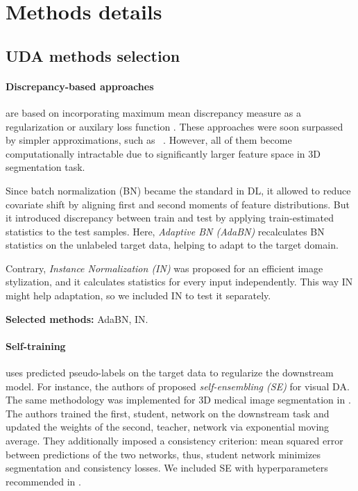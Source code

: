 

\section{Methods details}


\subsection{UDA methods selection}


\paragraph{Discrepancy-based approaches} are based on incorporating maximum mean discrepancy measure as a regularization or auxilary loss function \cite{mmd_ghifary2014domain,mmd_tzeng2014deep,mmd_long2015learning}. These approaches were soon surpassed by simpler approximations, such as ~\cite{deepcoral}. However, all of them become computationally intractable due to significantly larger feature space in 3D segmentation task.%

Since batch normalization (BN) \cite{bn} became the standard in DL, it allowed to reduce covariate shift by aligning first and second moments of feature distributions. But it introduced discrepancy between train and test by applying train-estimated statistics to the test samples. Here, \textit{Adaptive BN (AdaBN)} \cite{adabn} recalculates BN statistics on the unlabeled target data, helping to adapt to the target domain.

Contrary, \textit{Instance Normalization (IN)} \cite{instance_norm} was proposed for an efficient image stylization, and it calculates statistics for every input independently. This way IN might help adaptation, so we included IN to test it separately.


\textbf{Selected methods:} AdaBN, IN.


\paragraph{Self-training} uses predicted pseudo-labels on the target data to regularize the downstream model. For instance, the authors of \cite{se} proposed \textit{self-ensembling (SE)} for visual DA. The same methodology was implemented for 3D medical image segmentation in \cite{se_medim}. The authors trained the first, student, network on the downstream task and updated the weights of the second, teacher, network via exponential moving average. They additionally imposed a consistency criterion: mean squared error between predictions of the two networks, thus, student network minimizes segmentation and consistency losses. We included SE with hyperparameters recommended in \cite{se_medim}.

